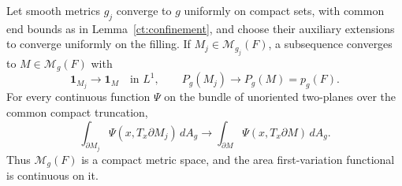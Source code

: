 \begin{proposition}
\label{ct:strict-compactness}
Let smooth metrics $g_j$ converge to $g$ uniformly on compact sets,
with common end bounds as in Lemma~\ref{ct:confinement}, and choose
their auxiliary extensions to converge uniformly on the filling.
If $M_j\in\mathcal M_{g_j}(F)$, a subsequence converges to
$M\in\mathcal M_g(F)$ with
\begin{equation}
\label{ct:strict-convergence}
 \mathbf1_{M_j}\longrightarrow\mathbf1_M\quad\text{in }L^1,\qquad
 P_g(M_j)\longrightarrow P_g(M)=p_g(F).
\end{equation}
For every continuous function $\Psi$ on the bundle of unoriented
two-planes over the common compact truncation,
\begin{equation}
\label{ct:plane-measure-continuity}
 \int_{\partial M_j}\Psi(x,T_x\partial M_j)\,dA_g
 \longrightarrow\int_{\partial M}\Psi(x,T_x\partial M)\,dA_g.
\end{equation}
Thus $\mathcal M_g(F)$ is a compact metric space, and the area
first-variation functional is continuous on it.
\end{proposition}

